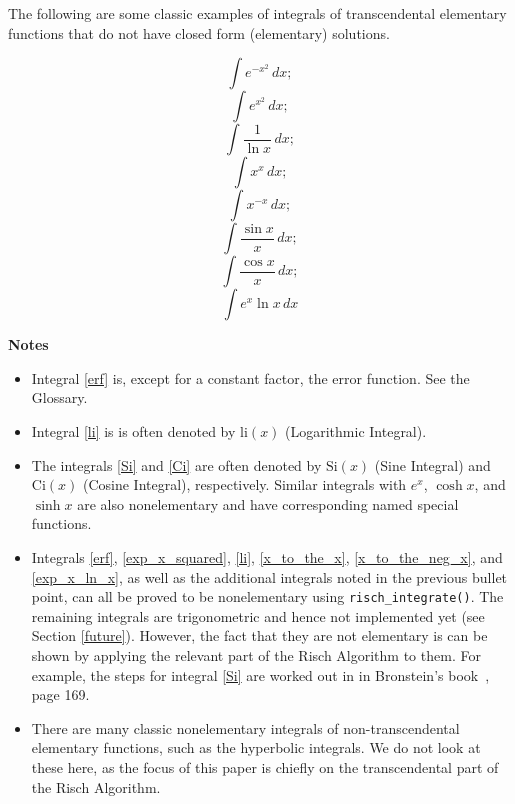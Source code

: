 \renewcommand{\thefootnote}{\fnsymbol{footnote}}	
The following are some classic examples of integrals of \gls{transcendental}
\gls{elementary} functions that do not have closed form (\gls{elementary})
solutions.

\begin{equation}
\label{erf}
\int{e^{-x^2}\,dx};
\end{equation}
\begin{equation}
\label{exp_x_squared}
\int{e^{x^2}\,dx};
\end{equation}
\begin{equation}
\label{li}
\int{\frac{1}{\ln{x}}\,dx};
\end{equation}
\begin{equation}
\label{x_to_the_x}
\int{x^x\,dx};
\end{equation}
\begin{equation}
\label{x_to_the_neg_x}
\int{x^{-x}\,dx};
\end{equation}
\begin{equation}
\label{Si}
\int{\frac{\sin{x}}{x}\,dx};
\end{equation}
\begin{equation}
\label{Ci}
\int{\frac{\cos{x}}{x}\,dx};
\end{equation}
\begin{equation}
\label{exp_x_ln_x}
\int{e^x\ln{x}\,dx}
\end{equation}

\textbf{Notes}
\begin{itemize}
\item Integral \ref{erf} is, except for a constant factor, the
\gls{error function}.  See the Glossary.
\item Integral \ref{li} is is often denoted by $\mathrm{li}(x)$
(Logarithmic Integral).
\item The integrals \ref{Si} and \ref{Ci} are often denoted by
$\mathrm{Si}(x)$ (Sine Integral) and $\mathrm{Ci}(x)$ (Cosine Integral),
respectively.  Similar integrals with $e^x$, $\cosh{x}$, and $\sinh{x}$
are also nonelementary and have corresponding named special functions.
\item Integrals \ref{erf}, \ref{exp_x_squared}, \ref{li},
\ref{x_to_the_x}, \ref{x_to_the_neg_x}, and \ref{exp_x_ln_x}, as well as
the additional integrals noted in the previous bullet point, can all be
proved to be nonelementary using \texttt{risch\_integrate()}.
The remaining integrals are trigonometric and hence not implemented yet
(see Section \ref{future}).  However, the fact that they are not
\gls{elementary} is can be shown by applying the relevant part of the Risch
Algorithm to them. For example, the steps  for integral \ref{Si} are
worked out in in Bronstein's book~\cite{bronstein2005symbolic}, page 169.
\item There are many classic nonelementary integrals of
non-\gls{transcendental} \gls{elementary} functions, such as the hyperbolic
integrals.  We do not look at these here, as the focus of this paper is
chiefly on the \gls{transcendental} part of the Risch Algorithm.
\end{itemize}